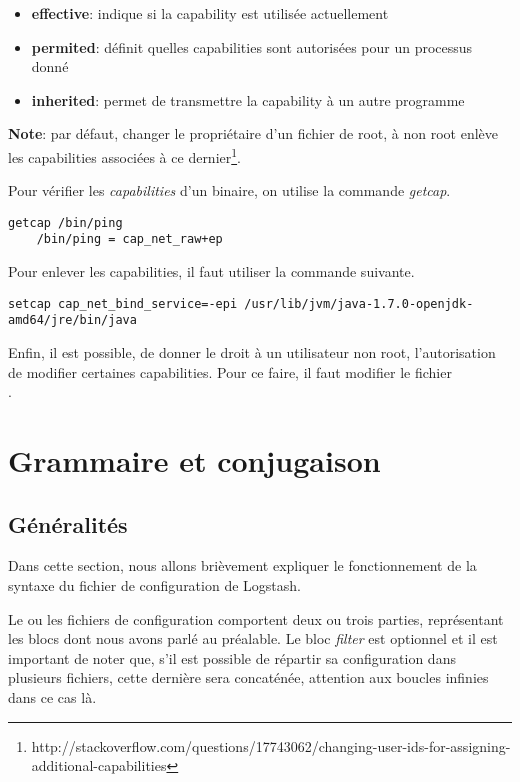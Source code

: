 \begin{itemize}
    \item \textbf{effective}: indique si la capability est utilisée actuellement
    \item \textbf{permited}: définit quelles capabilities sont autorisées pour un 
    processus donné
    \item \textbf{inherited}: permet de transmettre la capability à un autre programme
\end{itemize}
\textbf{Note}: par défaut, changer le propriétaire d'un fichier de root, à non root enlève
les capabilities associées à ce dernier\footnote{\scriptsize{http://stackoverflow.com/questions/17743062/changing-user-ids-for-assigning-additional-capabilities}}.

Pour vérifier les \textit{capabilities} d'un binaire, on utilise la commande 
\emph{getcap}.

\begin{lstlisting}[style=code,label={lst:getcapabilities}]
    getcap /bin/ping
    /bin/ping = cap_net_raw+ep
\end{lstlisting}

Pour enlever les capabilities, il faut utiliser la commande suivante.
\begin{lstlisting}[style=code,label={lst:unsetcapabilities}]
setcap cap_net_bind_service=-epi /usr/lib/jvm/java-1.7.0-openjdk-amd64/jre/bin/java
\end{lstlisting}

Enfin, il est possible, de donner le droit à un utilisateur non root, l'autorisation
de modifier certaines capabilities. Pour ce faire, il faut modifier le fichier \\[1mm]
.





\section{Grammaire et conjugaison}
\subsection{Généralités}
Dans cette section, nous allons brièvement expliquer le fonctionnement de la syntaxe 
du fichier de configuration de Logstash.

Le ou les fichiers de configuration comportent deux ou trois parties, représentant 
les blocs dont nous avons parlé au préalable. Le bloc \emph{filter} est optionnel
et il est important de noter que, s'il est possible de répartir sa configuration
dans plusieurs fichiers, cette dernière sera concaténée, attention aux boucles infinies
dans ce cas là.

